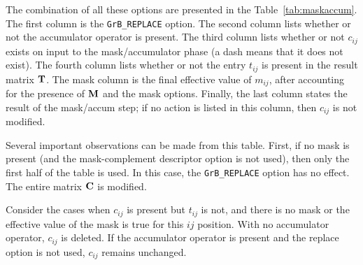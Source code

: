\documentclass[12pt]{article}
\begin{document}
The combination of all these options are presented in the
Table~\ref{tab:maskaccum}.  The first column is the \verb'GrB_REPLACE' option.
The second column lists whether or not the accumulator operator is present.
The third column lists whether or not $c_{ij}$ exists on input to the
mask/accumulator phase (a dash means that it does not exist).  The fourth
column lists whether or not the entry $t_{ij}$ is present in the result matrix
${\bf T}$.  The mask column is the final effective value of $m_{ij}$, after
accounting for the presence of ${\bf M}$ and the mask options.  Finally, the
last column states the result of the mask/accum step; if no action is listed in
this column, then $c_{ij}$ is not modified.

Several important observations can be made from this table.  First,
if no mask is present (and the mask-complement descriptor option is not used),
then only the first half of the table is used.  In this case, the \verb'GrB_REPLACE'
option has no effect.  The entire matrix ${\bf C}$ is modified.

Consider the cases when $c_{ij}$ is present but $t_{ij}$ is not, and there is no
mask or the effective value of the mask is true for this ${ij}$ position.  With
no accumulator operator, $c_{ij}$ is deleted.  If the accumulator operator is
present and the replace option is not used, $c_{ij}$ remains unchanged.
\end{document}
